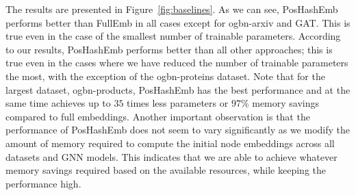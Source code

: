 \documentclass[conference]{IEEEtran}
\begin{document}
The results are presented in Figure~\ref{fig:baselines}. As we can see, PosHashEmb performs better than FullEmb in all cases except for ogbn-arxiv and GAT. This is true even in the case of the smallest number of trainable parameters. According to our results, PosHashEmb performs better than all other approaches; this is true even in the cases where we have reduced the number of trainable parameters the most, with the exception of the ogbn-proteins dataset. Note that for the largest dataset, ogbn-products, PosHashEmb has the best performance and at the same time achieves up to $35$ times less parameters or $97\%$ memory savings compared to full embeddings.  
Another important observation is that the performance of PosHashEmb does not seem to vary significantly as we modify the amount of memory required to compute the initial node embeddings across all datasets and GNN models. This indicates that we are able to achieve whatever memory savings required based on the available resources, while keeping the performance high.
\end{document}
